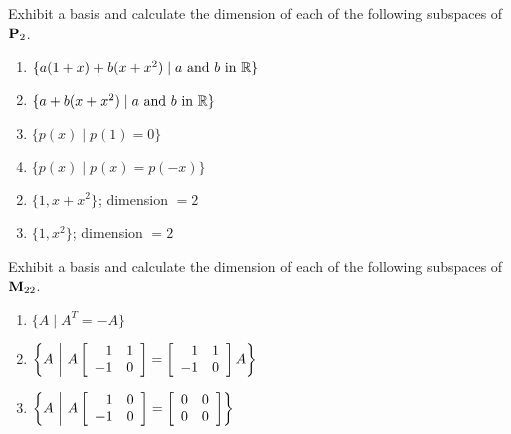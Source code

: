 \begin{multicols}{2}
\begin{ex}
Exhibit a basis and calculate the dimension of each of the following subspaces of $\textbf{P}_{2}$.

\begin{enumerate}[label={\alph*.}]
\item $\{a(1 + x) + b(x + x^{2}) \mid a \mbox{ and } b \mbox{ in } \mathbb{R}\}$

\item $\{a + b(x + x^{2}) \mid a \mbox{ and } b \mbox{ in } \mathbb{R}\}$

\item $\{p(x) \mid p(1) = 0\}$

\item $\{p(x) \mid p(x) = p(-x)\}$

\end{enumerate}
\begin{sol}
\begin{enumerate}[label={\alph*.}]
\setcounter{enumi}{1}
\item  $\{1, x + x^{2}\}$; dimension $= 2$

\setcounter{enumi}{3}
\item  $\{1, x^{2}\}$; dimension $= 2$

\end{enumerate}
\end{sol}
\end{ex}

\begin{ex}
Exhibit a basis and calculate the dimension of each of the following subspaces of $\textbf{M}_{22}$.

\begin{enumerate}[label={\alph*.}]
\item $\{A \mid A^{T} = -A\}$

\item $\left\{
A\ \middle|\ A 
\left[ \begin{array}{rr}
1 & 1 \\
-1 & 0
\end{array} \right]
=
\left[ \begin{array}{rr}
1 & 1 \\
-1 & 0
\end{array} \right]
A
\right\}$

\item $\left \{
A\ \middle|\ A 
\left[ \begin{array}{rr}
1 & 0 \\
-1 & 0
\end{array} \right]
=
\left[ \begin{array}{rr}
0 & 0 \\
0 & 0
\end{array} \right]
\right \}$


\end{enumerate}
\end{ex}
\end{multicols}
